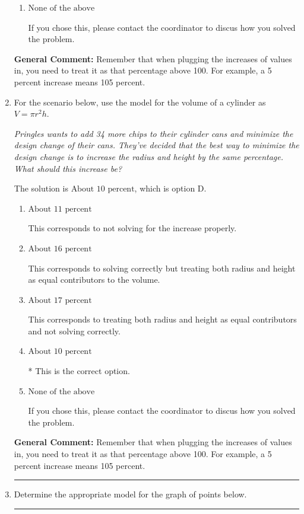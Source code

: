 \documentclass{extbook}[14pt]
\newcommand{\litem}[1]{\item #1

\rule{\textwidth}{0.4pt}}
\begin{document}
\begin{enumerate}
{\begin{enumerate}[label=\Alph*.]
This corresponds to treating both radius and height as equal contributors and not solving correctly.
\item \( \text{None of the above} \)

If you chose this, please contact the coordinator to discus how you solved the problem.
\end{enumerate}

\textbf{General Comment:} Remember that when plugging the increases of values in, you need to treat it as that percentage above 100. For example, a 5 percent increase means 105 percent.
}
\litem{
For the scenario below, use the model for the volume of a cylinder as $V = \pi r^2 h$.

\begin{center}
    \textit{ Pringles wants to add 34 \text{percent} more chips to their cylinder cans and minimize the design change of their cans. They've decided that the best way to minimize the design change is to increase the radius and height by the same percentage. What should this increase be? }
\end{center}
The solution is \( \text{About } 10 \text{ percent} \), which is option D.\begin{enumerate}[label=\Alph*.]
\item \( \text{About } 11 \text{ percent} \)

This corresponds to not solving for the increase properly.
\item \( \text{About } 16 \text{ percent} \)

This corresponds to solving correctly but treating both radius and height as equal contributors to the volume.
\item \( \text{About } 17 \text{ percent} \)

This corresponds to treating both radius and height as equal contributors and not solving correctly.
\item \( \text{About } 10 \text{ percent} \)

* This is the correct option.
\item \( \text{None of the above} \)

If you chose this, please contact the coordinator to discus how you solved the problem.
\end{enumerate}

\textbf{General Comment:} Remember that when plugging the increases of values in, you need to treat it as that percentage above 100. For example, a 5 percent increase means 105 percent.
}
\litem{
Determine the appropriate model for the graph of points below.

}
\end{enumerate}
\end{document}
